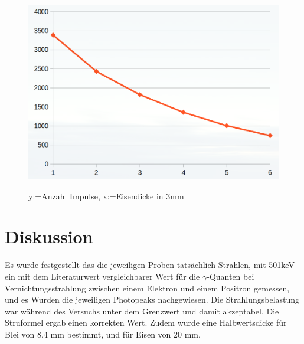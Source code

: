 \documentclass[11pt,a4paper]{article}
\begin{document}
    \begin{figure}
       \caption{y:=Anzahl Impulse, x:=Eisendicke in 3mm}
       \centering
       \includegraphics[scale=0.5]{Bilder/blei.png} \\
   \end{figure}
 \section{Diskussion}
  Es wurde festgestellt das die jeweiligen Proben tats\"achlich Strahlen, mit 501keV ein mit dem 
  Literaturwert vergleichbarer Wert f\"ur die $\gamma$-Quanten bei Vernichtungsstrahlung zwischen
  einem Elektron und einem Positron gemessen, und es Wurden die jeweiligen Photopeaks nachgewiesen.
  Die Strahlungsbelastung war w\"ahrend des Versuchs unter dem Grenzwert und damit akzeptabel.
  Die Struformel ergab einen korrekten Wert. Zudem wurde eine Halbwertsdicke f\"ur Blei von 8,4 mm 
  bestimmt, und f\"ur Eisen von 20 mm.
\end{document}
